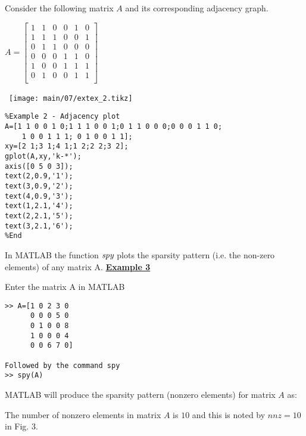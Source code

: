 \noindent
Consider the following matrix $A$ and its corresponding adjacency graph.
\begin{table}[H]
  \begin{minipage}[b]{0.50\linewidth}\centering
    \vskip -10pt
    $A=
    \begin{bmatrix}
      1 & 1 & 0 & 0 & 1 & 0\\
      1 & 1 & 1 & 0 & 0 & 1\\
      0 & 1 & 1 & 0 & 0 & 0\\
      0 & 0 & 0 & 1 & 1 & 0\\
      1 & 0 & 0 & 1 & 1 & 1\\
      0 & 1 & 0 & 0 & 1 & 1\\
    \end{bmatrix}$
    \vspace{3mm}
  \end{minipage}
  \begin{minipage}[b]{0.49\linewidth}\
    \texttt{[image: main/07/extex\_2.tikz]}
  \end{minipage}
\end{table}
\vskip -15pt
\noindent
\ttfamily
\begin{lstlisting}
%Example 2 - Adjacency plot
A=[1 1 0 0 1 0;1 1 1 0 0 1;0 1 1 0 0 0;0 0 0 1 1 0;
    1 0 0 1 1 1; 0 1 0 0 1 1];
xy=[2 1;3 1;4 1;1 2;2 2;3 2];
gplot(A,xy,'k-*');
axis([0 5 0 3]);
text(2,0.9,'1');
text(3,0.9,'2');
text(4,0.9,'3');
text(1,2.1,'4');
text(2,2.1,'5');
text(3,2.1,'6');
%End											
\end{lstlisting}

\rmfamily
\noindent
In MATLAB the function $\emph{spy}$ plots the sparsity pattern (i.e. the
non-zero elements) of any matrix A.
\vskip 10pt
\noindent
{\bf\underline {Example 3}}
\vskip 3pt
\begin{table}[H]
  \begin{minipage}[b]{0.50\linewidth}
    \noindent
    Enter the matrix A in MATLAB
    \noindent
    \begin{lstlisting}
>> A=[1 0 2 3 0
      0 0 0 5 0
      0 1 0 0 8
      1 0 0 0 4
      0 0 6 7 0]

Followed by the command spy
>> spy(A)
    \end{lstlisting}
    \vspace{5mm}
    \rmfamily
    \noindent
    MATLAB will produce the sparsity pattern \hfill\break
    \noindent
    (nonzero elements) for matrix $A$ as:
    \vspace{10mm}
  \end{minipage}
  \begin{minipage}[b]{0.49\linewidth}
      
  \end{minipage}
\end{table}
\noindent
\vskip -20pt
The number of nonzero elements in matrix $A$ is $10$ and this is noted by
$nnz=10$ in Fig. 3.

